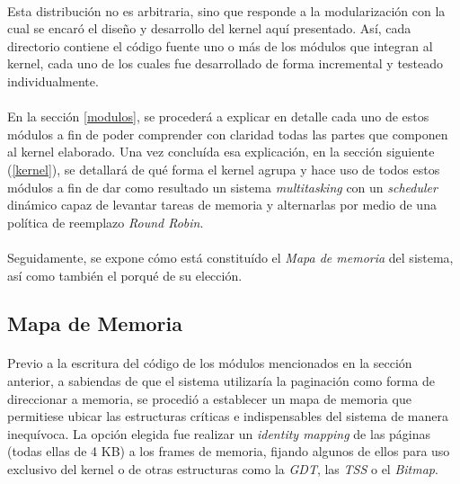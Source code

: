\documentclass[11pt, a4paper]{article}
\begin{document}
	\paragraph{}
	Esta distribución no es arbitraria, sino que responde a la modularización con la cual se encaró el diseño y desarrollo del kernel aquí presentado. Así, cada directorio contiene el código fuente uno o más de los módulos que integran al kernel, cada uno de los cuales fue desarrollado de forma incremental y testeado individualmente.
	
	\paragraph{}
	En la sección \ref{modulos}, se procederá a explicar en detalle cada uno de estos módulos a fin de poder comprender con claridad todas las partes que componen al kernel elaborado. Una vez concluída esa explicación, en la sección siguiente (\ref{kernel}), se detallará de qué forma el kernel agrupa y hace uso de todos estos módulos a fin de dar como resultado un sistema \textit{multitasking} con un \textit{scheduler} dinámico capaz de levantar tareas de memoria y alternarlas por medio de una política de reemplazo \textit{Round Robin}.
	
	\paragraph{}
	Seguidamente, se expone cómo está constituído el \textit{Mapa de memoria} del sistema, así como también el porqué de su elección.
	
	\subsection{Mapa de Memoria}
	\paragraph{}
	Previo a la escritura del código de los módulos mencionados en la sección anterior, a sabiendas de que el sistema utilizaría la paginación como forma de direccionar a memoria, se procedió a establecer un mapa de memoria que permitiese ubicar las estructuras críticas e indispensables del sistema de manera inequívoca. La opción elegida fue realizar un \textit{identity mapping} de las páginas (todas ellas de 4 KB) a los frames de memoria, fijando algunos de ellos para uso exclusivo del kernel o de otras estructuras como la \textit{GDT}, las \textit{TSS} o el \textit{Bitmap}.
	
\end{document}
